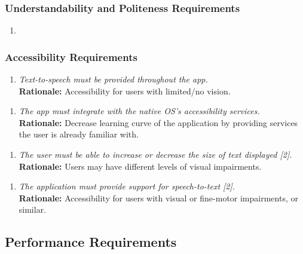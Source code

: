 \documentclass[]{article}
\begin{document}
\begin{enumerate}[{\bf BE1.}]
\subsubsection{Understandability and Politeness Requirements}
\label{ssub:understandability_and_politeness_requirements}
\begin{enumerate}[{NA} ]
    \item
\end{enumerate}


\subsubsection{Accessibility Requirements}
\label{ssub:accessibility_requirements}
\begin{enumerate}[{UH-A}1. ]
    \item \emph{Text-to-speech must be provided throughout the app.}\\
        {\bf Rationale:} Accessibility for users with limited/no vision.
\end{enumerate}
\begin{enumerate}[{UH-A}2. ]
    \item \emph{The app must integrate with the native OS’s accessibility services.}\\
        {\bf Rationale:} Decrease learning curve of the application by providing services the user is already familiar with.
\end{enumerate}
\begin{enumerate}[{UH-A}3. ]
    \item \emph{The user must be able to increase or decrease the size of text displayed [2].}\\
        {\bf Rationale:} Users may have different levels of visual impairments.
\end{enumerate}
\begin{enumerate}[{UH-A}4. ]
    \item \emph{The application must provide support for speech-to-text [2].}\\
        {\bf Rationale:} Accessibility for users with visual or fine-motor impairments, or similar.
\end{enumerate}




\subsection{Performance Requirements}
\label{sub:performance_requirements}



\end{enumerate}
\end{document}
